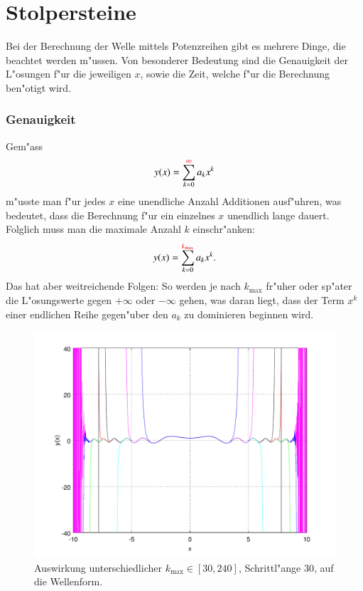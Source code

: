 \section{Stolpersteine}
Bei der Berechnung der Welle mittels Potenzreihen gibt es mehrere Dinge, die 
beachtet werden m"ussen. Von besonderer Bedeutung sind die Genauigkeit der 
L"osungen f"ur die jeweiligen $x$, sowie die Zeit, welche f"ur die 
Berechnung ben"otigt wird.

\subsubsection{Genauigkeit}
Gem"ass
\begin{equation*}
	y(x) = \sum_{k=0}^{\textcolor{red}{\infty}}a_kx^k
\end{equation*}
m"usste man f"ur jedes $x$ eine unendliche Anzahl Additionen ausf"uhren, was 
bedeutet, dass die Berechnung f"ur ein einzelnes $x$ unendlich lange 
dauert. Folglich muss man die maximale Anzahl $k$ einschr"anken:
\begin{equation*}
	y(x) = \sum_{k=0}^{\textcolor{red}{k_{\text{max}}}}a_kx^k.
\end{equation*}
Das hat aber weitreichende Folgen: So werden je nach $k_{\text{max}}$ fr"uher 
oder sp"ater die L"osungswerte gegen $+\infty$ oder $-\infty$ gehen, was daran 
liegt, dass der Term $x^k$ einer endlichen Reihe gegen"uber den $a_k$ zu 
dominieren beginnen wird.

\begin{figure}
	\includegraphics[width=1\hsize]{./wellen/images/kmax/kmax.pdf}
	\caption{Auswirkung unterschiedlicher $k_{\text{max}} \in [30,240]$, 
	Schrittl"ange 30, auf die Wellenform.}
	\label{fig:wellen:variablekmax}
\end{figure}

